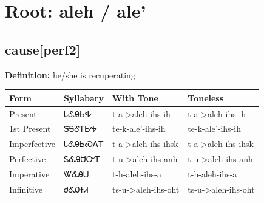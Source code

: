 \documentclass{article}%
\begin{document}
%
\normalsize%
\section*{Root: aleh / ale'}%
\subsection*{cause[perf2]}%
\textbf{Definition: }%
he/she is recuperating%
\\[0.5em]%
\begin{tabular}{|l|l|l|l|}%
\hline%
\textbf{Form}&\textbf{Syllabary}&\textbf{With Tone}&\textbf{Toneless}\\%
\hline%
Present&ᏓᎴᎯᏏᎭ&t{-}a{-}>aleh{-}ihs{-}ih&t{-}a{-}>aleh{-}ihs{-}ih\\%
1st Present&ᏕᎦᎴᎢᏏᎭ&te{-}k{-}ale'{-}ihs{-}ih&te{-}k{-}ale'{-}ihs{-}ih\\%
Imperfective&ᏓᎴᎯᏏᏍᎪᎢ&t{-}a{-}>aleh{-}ihs{-}ihsk&t{-}a{-}>aleh{-}ihs{-}ihsk\\%
Perfective&ᏚᎴᎯᏌᏅᎢ&t{-}u{-}>aleh{-}ihs{-}anh&t{-}u{-}>aleh{-}ihs{-}anh\\%
Imperative&ᏔᎴᎯᏌ&t{-}h{-}aleh{-}ihs{-}a&t{-}h{-}aleh{-}ihs{-}a\\%
Infinitive&ᏧᎴᎯᏐᏗ&ts{-}u{-}>aleh{-}ihs{-}oht&ts{-}u{-}>aleh{-}ihs{-}oht\\%
\hline%
\end{tabular}%
\\[1em]%
\end{document}
